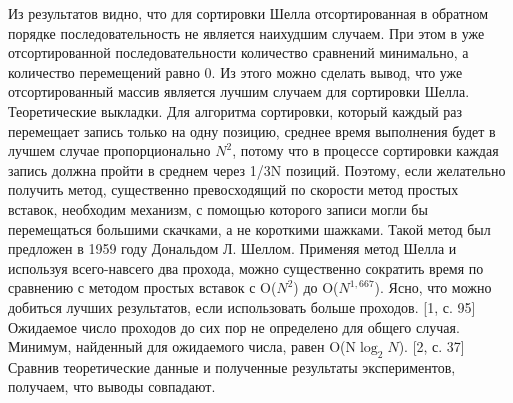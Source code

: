 \documentclass[a4paper,12pt,titlepage,finall]{article}
\begin{document}
Из результатов видно, что для сортировки Шелла отсортированная в обратном порядке последовательность не является наихудшим случаем. При этом в уже отсортированной последовательности количество сравнений минимально, а количество перемещений равно 0. Из этого можно сделать вывод, что уже отсортированный массив является лучшим случаем для сортировки Шелла. \\

Теоретические выкладки. Для алгоритма сортировки, который каждый раз перемещает запись только на одну позицию, среднее время выполнения будет в лучшем случае пропорционально $N^2$, потому что в процессе сортировки каждая запись должна пройти в среднем через 1/3N позиций. Поэтому, если желательно получить метод, существенно превосходящий по скорости метод простых вставок, необходим механизм, с помощью которого записи могли бы перемещаться большими скачками, а не короткими шажками. Такой метод был предложен в 1959 году Дональдом Л. Шеллом. Применяя метод Шелла и используя всего-навсего два прохода, можно существенно сократить время по сравнению с методом простых вставок с O($N^2$) до O($N^{1,667}$). Ясно, что можно добиться лучших результатов, если использовать больше проходов. [1, с. 95] Ожидаемое число проходов до сих пор не определено для общего случая. Минимум, найденный для ожидаемого числа, равен O(N$\log_2{N}$). [2, с. 37]
\\

Сравнив теоретические данные и полученные результаты экспериментов, получаем, что выводы совпадают.
\end{document}
